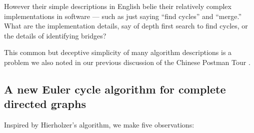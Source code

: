 \documentclass[prodmode,acmtecs]{acmsmall} %
\begin{document}
However their simple descriptions in English belie their relatively complex implementations in software --- such as just saying ``find cycles'' and ``merge.'' What are the implementation details, say of depth first search to find cycles, or the details of identifying bridges? 

This common but deceptive simplicity of many algorithm descriptions is a problem we also noted in our previous discussion of the Chinese Postman Tour \cite{cpp}. 


\subsection{A new Euler cycle algorithm for complete directed graphs}

\def\pair#1#2{\ifx #1#2
#1\rightarrow #2 %
\else #1\rightarrow#2\rightarrow#1\fi}

Inspired by Hierholzer's algorithm, we make five observations:
\end{document}
